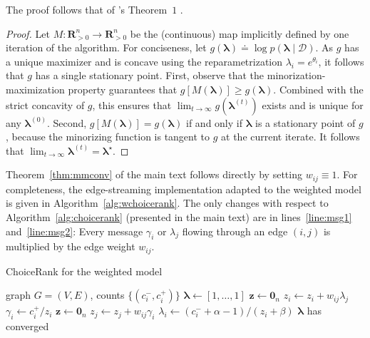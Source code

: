 The proof follows that of \citeauthor{hunter2004mm}'s Theorem~$1$ \citeyearpar{hunter2004mm}.

\begin{proof}
Let $M: \mathbf{R}^n_{>0} \to \mathbf{R}^n_{>0}$ be the (continuous) map implicitly defined by one iteration of the algorithm.
For conciseness, let $g(\bm{\lambda}) \doteq \log p(\bm{\lambda} \mid \mathcal{D})$.
As $g$ has a unique maximizer and is concave using the reparametrization $\lambda_i = e^{\theta_i}$, it follows that $g$ has a single stationary point.
First, observe that the minorization-maximization property guarantees that $g \left[ M(\bm{\lambda}) \right] \ge g(\bm{\lambda})$.
Combined with the strict concavity of $g$, this ensures that $\lim_{t \to \infty} g(\bm{\lambda}^{(t)})$ exists and is unique for any $\bm{\lambda}^{(0)}$.
Second, $g \left[ M(\bm{\lambda}) \right] = g(\bm{\lambda})$ if and only if $\bm{\lambda}$ is a stationary point of $g$, because the minorizing function is tangent to $g$ at the current iterate.
It follows that $\lim_{t \to \infty} \bm{\lambda}^{(t)} = \bm{\lambda}^{\star}$.
\end{proof}

Theorem~\ref{thm:mmconv} of the main text follows directly by setting $w_{ij} \equiv 1$.
For completeness, the edge-streaming implementation adapted to the weighted model is given in Algorithm~\ref{alg:wchoicerank}.
The only changes with respect to Algorithm~\ref{alg:choicerank} (presented in the main text) are in lines~\ref{line:msg1} and~\ref{line:msg2}:
Every message $\gamma_i$ or $\lambda_j$ flowing through an edge $(i,j)$ is multiplied by the edge weight $w_{ij}$.

\begin{algorithm}[ht]
  \caption{ChoiceRank for the weighted model}
  \label{alg:wchoicerank}
  \begin{algorithmic}[1]
    \Require graph $G = (V, E)$, counts $\{ (c^-_i, c^+_i) \}$
    \State $\bm{\lambda} \gets [1, \ldots, 1]$
    \Repeat
      \State $\bm{z} \gets \bm{0}_n$
       $z_i \gets z_i + w_{ij} \lambda_j$ \label{line:msg1}
       $\gamma_i \gets c^+_i / z_i$
      \State $\bm{z} \gets \bm{0}_n$
       $z_j \gets z_j + w_{ij} \gamma_i$ \label{line:msg2}
       $\lambda_i \gets (c^-_i + \alpha - 1) / (z_i + \beta)$
    \Until $\bm{\lambda}$ has converged
  \end{algorithmic}
\end{algorithm}


